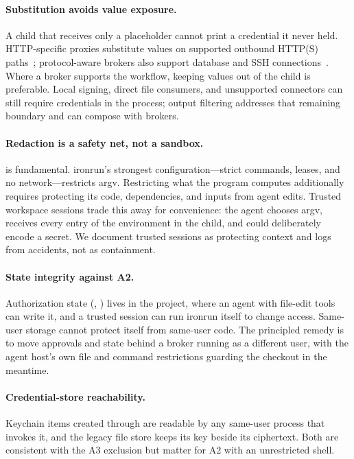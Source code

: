 \documentclass[10pt,twocolumn]{article}
\newcommand{\sys}{\textsf{ironrun}}
\newcommand{\code}[1]{\textup{\texttt{\detokenize{#1}}}}
\begin{document}
\paragraph{Substitution avoids value exposure.} A child that receives only a
placeholder cannot print a credential it never held. HTTP-specific proxies
substitute values on supported outbound HTTP(S) paths~\citep{claudecode_sandboxing,infisical_agentproxy,onecli2026};
protocol-aware brokers also support database and SSH connections~\citep{cyberark_secretless}.
Where a broker supports the workflow, keeping values out of the child is
preferable. Local signing, direct file consumers, and unsupported connectors
can still require credentials in the process; output filtering addresses that
remaining boundary and can compose with brokers.

\paragraph{Redaction is a safety net, not a sandbox.}  is
fundamental. \sys{}'s strongest configuration---strict commands, leases, and no
network---restricts argv. Restricting what the program computes additionally
requires protecting its code, dependencies, and inputs from agent edits. Trusted workspace sessions trade this away for
convenience: the agent chooses argv, receives every entry of the environment in
the child, and could deliberately encode a secret. We document trusted sessions
as protecting context and logs from accidents, not as containment.

\paragraph{State integrity against A2.} Authorization state (\code{.ironrun/},
\code{ironrun.yml}) lives in the project, where an agent with file-edit tools
can write it, and a trusted session can run \sys{} itself to change access. Same-user
storage cannot protect itself from same-user code. The principled remedy is to
move approvals and state behind a broker running as a different user, with the
agent host's own file and command restrictions guarding the checkout in the
meantime.

\paragraph{Credential-store reachability.} Keychain items created through
\code{/usr/bin/security} are readable by any same-user process that invokes it,
and the legacy file store keeps its key beside its ciphertext. Both are
consistent with the A3 exclusion but matter for A2 with an unrestricted shell.
\end{document}

